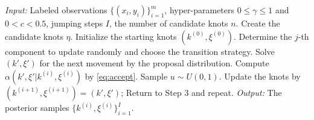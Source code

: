 \begin{algorithm}
\caption{Extended Bayesian adaptive regression spline algorithm via RJMCMC}
\label{alg:ebars}
\begin{algorithmic}[1]
\Statex \emph{Input:} Labeled observations $\{(x_i,y_i)\}_{i=1}^m$, hyper-parameters $0\leq \gamma\leq 1$ and $0<c<0.5$, jumping steps $I$, the number of candidate knots $n$.
\State Create the candidate knots $\eta$. Initialize the starting knots $(k^{(0)},\xi^{(0)})$.
\State Determine the $j$-th component to update randomly and choose the transition strategy.
\State Solve $(k',\xi')$ for the next movement by the proposal distribution.
\State Compute $\alpha(k',\xi'|k^{(i)},\xi^{(i)})$ by \eqref{eq:accept}. Sample $u\sim U(0,1)$.
\State Update the knots by $(k^{(i+1)},\xi^{(i+1)})=(k',\xi')$;
\Else
\State Return to Step 3 and repeat.
\EndIf
\EndFor
\Statex \emph{Output:} The posterior samples $\{k^{(i)},\xi^{(i)}\}_{i=1}^I$.
\end{algorithmic}
\end{algorithm}